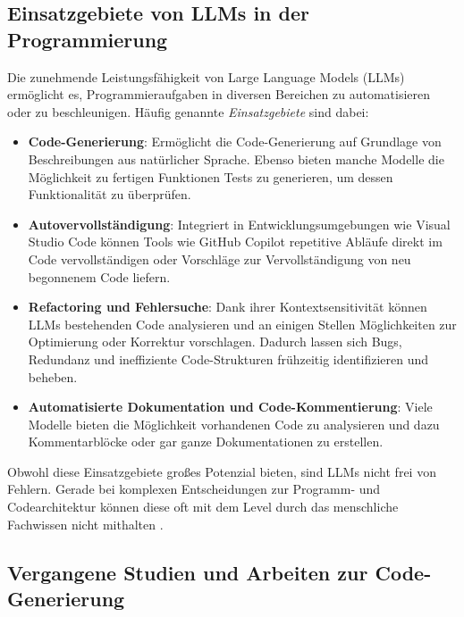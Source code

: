 \documentclass[11pt,a4paper]{article}
\begin{document}
\subsection{Einsatzgebiete von LLMs in der Programmierung}
\label{sec:einsatzgebiete}
Die zunehmende Leistungsfähigkeit von Large Language Models (LLMs) ermöglicht es, Programmieraufgaben in diversen Bereichen zu automatisieren oder zu beschleunigen. Häufig genannte \emph{Einsatzgebiete} sind dabei:
\begin{itemize}
    \item \textbf{Code-Generierung}:
    Ermöglicht die Code-Generierung auf Grundlage von Beschreibungen aus natürlicher Sprache\cite{chen2021evaluatinglargelanguagemodels}. Ebenso bieten manche Modelle die Möglichkeit zu fertigen Funktionen Tests zu generieren, um dessen Funktionalität zu überprüfen.
    \item \textbf{Autovervollständigung}:  
    Integriert in Entwicklungsumgebungen wie Visual Studio Code können Tools wie GitHub Copilot repetitive Abläufe direkt im Code vervollständigen oder Vorschläge zur Vervollständigung von neu begonnenem Code liefern\cite{chen2021evaluatinglargelanguagemodels}.
    \item \textbf{Refactoring und Fehlersuche}:  
    Dank ihrer Kontextsensitivität können LLMs bestehenden Code analysieren und an einigen Stellen Möglichkeiten zur Optimierung oder Korrektur vorschlagen\cite{chen2021evaluatinglargelanguagemodels,wang2021codet5identifierawareunifiedpretrained}. Dadurch lassen sich Bugs, Redundanz und ineffiziente Code-Strukturen frühzeitig identifizieren und beheben.
    \item \textbf{Automatisierte Dokumentation und Code-Kommentierung}:  
    Viele Modelle bieten die Möglichkeit vorhandenen Code zu analysieren und dazu Kommentarblöcke oder gar ganze Dokumentationen zu erstellen\cite{wang2021codet5identifierawareunifiedpretrained,jiang2024surveylargelanguagemodels}.
\end{itemize}
Obwohl diese Einsatzgebiete großes Potenzial bieten, sind LLMs nicht frei von Fehlern. Gerade bei komplexen Entscheidungen zur Programm- und Codearchitektur können diese oft mit dem Level durch das menschliche Fachwissen nicht mithalten \cite{dhar2024llmsgeneratearchitecturaldesign}.

\subsection{Vergangene Studien und Arbeiten zur Code-Generierung}
\label{sec:vergangene_studien}
\end{document}
